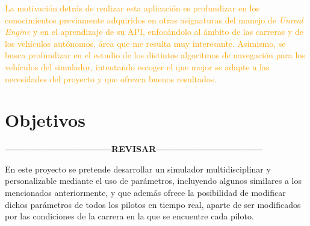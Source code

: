 \documentclass[a4paper,11pt]{book}
\begin{document}
\bigskip

\textcolor{orange}{La motivación detrás de realizar esta aplicación es profundizar en los conocimientos previamente adquiridos en otras asignaturas del manejo de \textit{Unreal Engine} y en el aprendizaje de su API, enfocándolo al ámbito de las carreras y de los vehículos autónomos, área que me resulta muy interesante. Asimismo, se busca profundizar en el estudio de los distintos algoritmos de navegación para los vehículos del simulador, intentando escoger el que mejor se adapte a las necesidades del proyecto y que ofrezca buenos resultados.}

\bigskip





\section{Objetivos}

\textbf{---------------------------------REVISAR---------------------------------}

En este proyecto se pretende desarrollar un simulador multidisciplinar y personalizable mediante el uso de parámetros, incluyendo algunos similares a los mencionados anteriormente, y que además ofrece la posibilidad de modificar dichos parámetros de todos los pilotos en tiempo real, aparte de ser modificados por las condiciones de la carrera en la que se encuentre cada piloto.
\end{document}
